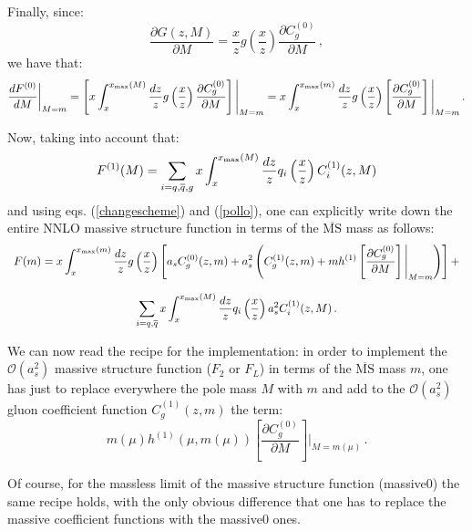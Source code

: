 \documentclass[10pt,a4paper]{article}
\begin{document}
Finally, since:
\begin{equation}
\frac{\partial G(z,M)}{\partial M} = \frac{x}{z}g\left(\frac{x}{z}\right)\frac{\partial C_g^{(0)}}{\partial M}\,,
\end{equation}
we have that:
\begin{equation}
\frac{dF^{(0)}}{dM}\bigg|_{M=m}=\left[x\int_x^{x_{\mbox{\tiny
        max}}(M)}\frac{dz}{z}g\left(\frac{x}{z}\right)\frac{\partial
    C_g^{(0)}}{\partial M}\right]\Bigg|_{M=m}=x\int_x^{x_{\mbox{\tiny
      max}}(m)}\frac{dz}{z}g\left(\frac{x}{z}\right)\left[\frac{\partial
    C_g^{(0)}}{\partial M}\right]\Bigg|_{M=m}\,.
\label{pollo}
\end{equation}

Now, taking into account that:
\begin{equation}
F^{(1)}(M) = \sum_{i=q,\overline{q},g}x\int_x^{x_{\mbox{\tiny max}}(M)} \frac{dz}{z}q_i\left(\frac{x}{z}\right)C_i^{(1)}(z,M)
\end{equation}
and using eqs. (\ref{changescheme}) and (\ref{pollo}), one can explicitly write down the entire NNLO massive structure function in terms of the $\overline{\mbox{MS}}$ mass as follows:
\begin{equation}
\begin{array}{c}
\displaystyle F(m) = x\int_x^{x_{\mbox{\tiny max}}(m)} \frac{dz}{z}g\left(\frac{x}{z}\right)\left[a_sC_g^{(0)}(z,m)+a_s^2\left(C_g^{(1)}(z,m)+mh^{(1)}\left[\frac{\partial C_g^{(0)}}{\partial M}\right]\Bigg|_{M=m}\right)\right]+\\
\\
\displaystyle \sum_{i=q,\overline{q}}x\int_x^{x_{\mbox{\tiny max}}(M)} \frac{dz}{z}q_i\left(\frac{x}{z}\right)a_s^2C_i^{(1)}(z,M)\,.
\end{array}
\label{master}
\end{equation}

We can now read the recipe for the implementation: in order to implement the $\mathcal{O}(a_s^2)$ massive structure function ($F_2$ or $F_L$) in terms of the $\overline{\mbox{MS}}$ mass $m$, one has just to replace everywhere the pole mass $M$ with $m$ and add to the $\mathcal{O}(a_s^2)$ gluon coefficient function $C_g^{(1)}(z,m)$ the term:
\begin{equation}
m(\mu)h^{(1)}(\mu,m(\mu))\left[\frac{\partial C_g^{(0)}}{\partial M}\right]\Bigg|_{M=m(\mu)}\,.
\end{equation}

Of course, for the massless limit of the massive structure function (massive0) the same recipe holds, with the only obvious difference that one has to replace the massive coefficient functions with the massive0 ones.
\end{document}

